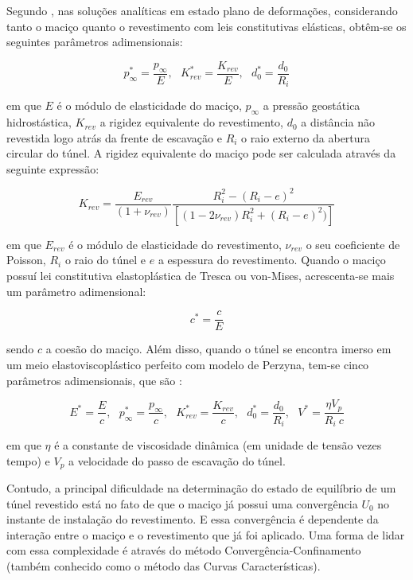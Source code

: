 Segundo , nas soluções analíticas em estado plano de deformações, considerando tanto o maciço quanto o revestimento com leis constitutivas elásticas, obtêm-se os seguintes parâmetros adimensionais:

\begin{equation}
	p_\infty^* = \frac{p_\infty}{E},~~~ K_{rev}^* = \frac{K_{rev}}{E},~~~ d_0^* = \frac{d_0}{R_i} 
\end{equation}

em que $E$ é o módulo de elasticidade do maciço, $p_\infty$ a pressão geostática hidrostástica, $K_{rev}$ a rigidez equivalente do revestimento, $d_0$ a distância não revestida logo atrás da frente de escavação e $R_i$ o raio externo da abertura circular do túnel. A rigidez equivalente do maciço pode ser calculada através da seguinte expressão:

\begin{equation}
	K_{rev} = \dfrac{E_{rev}}{(1+\nu_{rev})}\dfrac{R_i^2-(R_i-e)^2}{\left[(1-2\nu_{rev})R_i^2+(R_i-e)^2)\right]} 
\end{equation}

em que $E_{rev}$ é o módulo de elasticidade do revestimento, $\nu_{rev}$ o seu coeficiente de Poisson, $R_i$ o raio do túnel e $e$ a espessura do revestimento. Quando o maciço possuí lei constitutiva elastoplástica de Tresca ou von-Mises, acrescenta-se mais um parâmetro adimensional:

\begin{equation}
	c^* = \frac{c}{E} 
\end{equation}

sendo $c$ a coesão do maciço. Além disso, quando o túnel se encontra imerso em um meio elastoviscoplástico perfeito com modelo de Perzyna, tem-se cinco parâmetros adimensionais, que são \cite[p. 198]{Bernaud1991}:

\begin{equation}
	\label{eq:parametros_admensionais_vp}
	E^* = \frac{E}{c},~~~ p_\infty^* = \frac{p_\infty}{c},~~~ K_{rev}^* = \frac{K_{rev}}{c},~~~ d_0^* = \frac{d_0}{R_i},~~~ V^*=\frac{\eta V_p}{R_i~c}
\end{equation}

em que $\eta$ é a constante de viscosidade dinâmica (em unidade de tensão vezes tempo) e $V_p$ a velocidade do passo de escavação do túnel.

Contudo, a principal dificuldade na determinação do estado de equilíbrio de um túnel revestido está no fato de que o maciço já possui uma convergência $U_0$ no instante de instalação do revestimento. E essa convergência é dependente da interação entre o maciço e o revestimento que já foi aplicado. Uma forma de lidar com essa complexidade é através do método Convergência-Confinamento (também conhecido como o método das Curvas Características).

